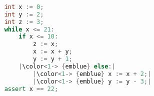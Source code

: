 \begin{lstlisting}[language=C++,basicstyle=\ttfamily,keywordstyle=\color{blue}, escapechar={|}]  % Start your code-block
	
	int x := 0;
	int y := 2;
	int z := 3;
	while x <= 21:
		if x <= 10:
			z := x;
			x := x + y;
			y := y + 1;
		|\color<1-> {emblue} else:|
			|\color<1-> {emblue} x := x + 2;|
			|\color<1-> {emblue} y := y - 3;|
	assert x == 22;
	\end{lstlisting}